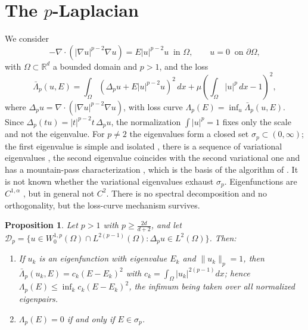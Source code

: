 \documentclass[10pt]{amsart}
\theoremstyle{definition}
\theoremstyle{remark}
\theoremstyle{plain}
\newtheorem{proposition}[theorem]{Proposition}
\newcommand{\R}{\mathbb{R}}
\begin{document}
\section{The \texorpdfstring{$p$}{p}-Laplacian}\label{sec.nolin}

We consider
\begin{equation}\label{p-eigen}
-\nabla \cdot (|\nabla u|^{p-2} \nabla u) = E |u|^{p-2} u \ \text{ in } \Omega, \qquad
u = 0 \ \text{ on } \partial \Omega,
\end{equation}
with $\Omega \subset \R^{d}$ a bounded domain and $p > 1$, and the loss
\begin{equation}\label{loss.p}
\bar\Lambda_p(u, E) = \int_{\Omega} \left( \Delta_p u + E |u|^{p-2} u \right)^2 \, dx + \mu \left( \int_{\Omega} |u|^p\, dx - 1 \right)^2,
\end{equation}
where $\Delta_p u = \nabla \cdot (|\nabla u|^{p-2} \nabla u)$, with loss curve
$\Lambda_p(E)=\inf_u\bar\Lambda_p(u,E)$. Since $\Delta_p(tu)=|t|^{p-2}t\,\Delta_pu$, the normalization
$\int|u|^p=1$ fixes only the scale and not the eigenvalue. For $p\ne2$ the eigenvalues form a closed set
$\sigma_p\subset(0,\infty)$; the first eigenvalue is simple and isolated \cite{Anane1987,Lindqvist1990},
there is a sequence of variational eigenvalues \cite{GarciaAzorero-Peral}, the second eigenvalue
coincides with the second variational one \cite{Anane-Tsouli} and has a mountain-pass characterization
\cite{Cuesta-deFigueiredo-Gossez}, which is the basis of the algorithm of \cite{HJ11}. It is not known
whether the variational eigenvalues exhaust $\sigma_p$. Eigenfunctions are $C^{1,\alpha}$
\cite{DiBenedetto,Tolksdorf}, but in general not $C^2$. There is no spectral decomposition and no
orthogonality, but the loss-curve mechanism survives.

\begin{proposition}\label{prop.plap}
Let $p>1$ with $p\ge\frac{2d}{d+2}$, and let $\mathcal D_p=\{u\in W^{1,p}_0(\Omega)\cap
L^{2(p-1)}(\Omega)\colon\Delta_pu\in L^2(\Omega)\}$. Then:
\begin{enumerate}
\item[(a)] If $u_k$ is an eigenfunction with eigenvalue $E_k$ and $\|u_k\|_p=1$, then
$\bar\Lambda_p(u_k,E)=c_k(E-E_k)^2$ with $c_k=\int_\Omega|u_k|^{2(p-1)}dx$; hence
$\Lambda_p(E)\le\inf_kc_k(E-E_k)^2$, the infimum being taken over all normalized eigenpairs.
\item[(b)] $\Lambda_p(E)=0$ if and only if $E\in\sigma_p$.
\end{enumerate}
\end{proposition}
\end{document}
